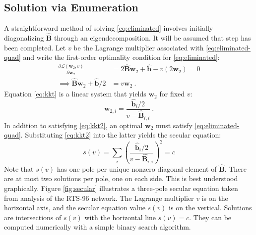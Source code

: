 \documentclass[journal,twoside]{IEEEtran}
\renewcommand{\vec}[1]{\mathbf{#1}}
\begin{document}
\subsection{Solution via Enumeration}\label{sec:solution-enumeration}
A straightforward method of solving \eqref{eq:eliminated} involves initially diagonalizing $\hat{\mathbf{B}}$ through an eigendecomposition. It will be assumed that step has been completed. Let $v$ be the Lagrange multiplier associated with \eqref{eq:eliminated-quad} and write the first-order optimality condition for \eqref{eq:eliminated}:
\begin{align}
\nonumber \frac{\partial \mathcal{L}(\vec{w}_2,v)}{\partial \vec{w}_2} &= 2\hat{\mathbf{B}}\vec{w}_2 + \hat{\vec{b}} - v(2\vec{w}_2) = 0 \\
\label{eq:kkt} \implies \hat{\mathbf{B}}\vec{w}_2 + \hat{\vec{b}}/2 &= v\vec{w}_2~.
\end{align}
Equation \eqref{eq:kkt} is a linear system that yields $\vec{w}_2$ for fixed $v$:
\begin{equation}
\label{eq:kkt2}\vec{w}_{2,i} = \frac{\hat{\vec{b}}_i/2}{v - \hat{\mathbf{B}}_{i,i}}~.
\end{equation}
In addition to satisfying \eqref{eq:kkt2}, an optimal $\vec{w}_2$ must
satisfy \eqref{eq:eliminated-quad}. Substituting \eqref{eq:kkt2} into the latter yields the secular equation:
\begin{equation}\label{eq:secular}
s(v) = \sum_{i}\left( \frac{\hat{\vec{b}}_i /2}{v - \hat{\mathbf{B}}_{i,i}}\right)^2 = c
\end{equation}
Note that $s(v)$ has one pole per unique nonzero diagonal element of $\hat{\mathbf{B}}$. There are at most two solutions per pole, one on each side. This is best understood graphically. Figure \ref{fig:secular}
illustrates a three-pole secular equation taken from analysis of the RTS-96 network. The Lagrange multiplier $v$ is on the horizontal axis, and the secular equation value $s(v)$ is on the vertical. Solutions are intersections of $s(v)$ with the horizontal line $s(v)=c$. They can be computed numerically with a simple binary search algorithm.
\end{document}
